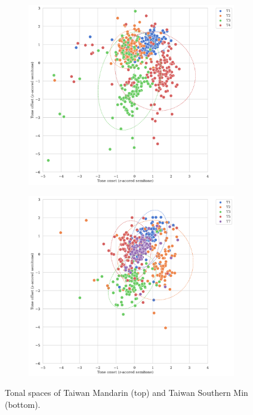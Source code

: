 \begin{figure}[hbt!]
\centering
\begin{subfigure}[b]{.8\textwidth}
\centering
\includegraphics[width=\textwidth]{figures/Tone_space_Mandarin.png}
\end{subfigure}
\begin{subfigure}[b]{.8\textwidth}
\centering
\includegraphics[width=\textwidth]{figures/Tone_space_Min.png}
\end{subfigure}

\caption{Tonal spaces of Taiwan Mandarin (top) and Taiwan Southern Min (bottom).}
\label{Figure:ToneSpace}
\end{figure}

